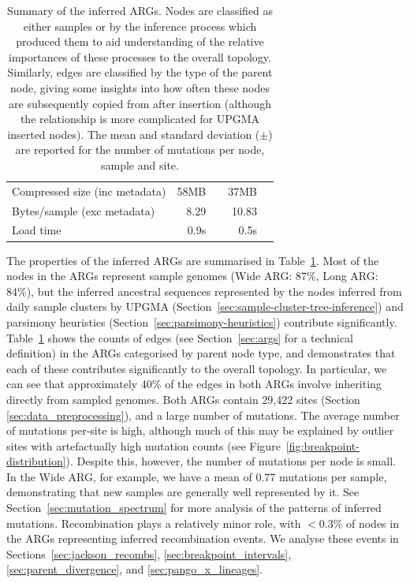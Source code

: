 \documentclass{article}
\begin{document}
\begin{table}
\begin{center}
\begin{tabular}{llrlrl}
    \cmidrule{2-6}
    \multicolumn{2}{l}{Compressed size (inc metadata)} & 58MB & & 37MB&  \\
    \multicolumn{2}{l}{Bytes/sample (exc metadata)}  & 8.29  & & 10.83 \\
    Load time & & 0.9s & & 0.5s & \\
    \bottomrule
\end{tabular}
\end{center}
\caption{\label{tab:args}Summary of the inferred ARGs. Nodes are classified
as either samples or by the inference process which produced them to aid
understanding of the relative importances of these processes to the overall
topology. Similarly, edges are classified by the type of the parent node,
giving some insights into how often these nodes are subsequently
copied from after insertion (although the relationship is more complicated
for UPGMA inserted nodes). The mean and standard deviation ($\pm$)
are reported for the number of mutations per node, sample and site.
}
\end{table}

The properties of the inferred ARGs are summarised in Table~\ref{tab:args}.
Most of the nodes in the ARGs represent sample genomes
(Wide ARG: 87\%, Long ARG: 84\%), but the inferred ancestral sequences
represented by the nodes inferred from daily sample clusters
by UPGMA (Section~\ref{sec:sample-cluster-tree-inference})
and parsimony heuristics (Section~\ref{sec:parsimony-heuristics})
contribute significantly.
Table~\ref{tab:args} shows the counts of edges (see
Section~\ref{sec:args} for a technical definition) in the ARGs
categorised by parent node type, and demonstrates that each
of these contributes significantly to the overall topology.
In particular, we can see that approximately 40\% of the edges
in both ARGs involve inheriting directly from sampled genomes.
Both ARGs contain 29,422 sites (Section \ref{sec:data_preprocessing}),
and a large number of mutations.
The average number of mutations per-site is high, although much
of this may be explained by outlier sites with artefactually high
mutation counts (see Figure~\ref{fig:breakpoint-distribution}).
Despite this, however, the number of mutations per node
is small. In the Wide ARG, for example, we have a mean of 0.77
mutations per sample, demonstrating that new samples are generally
well represented by it. See Section~\ref{sec:mutation_spectrum}
for more analysis of the patterns of inferred mutations.
Recombination plays a relatively minor role, with $<0.3\%$
of nodes in the ARGs representing inferred recombination events.
We analyse these events in Sections~\ref{sec:jackson_recombs},
\ref{sec:breakpoint_intervals}, \ref{sec:parent_divergence},
and \ref{sec:pango_x_lineages}.
\end{document}
